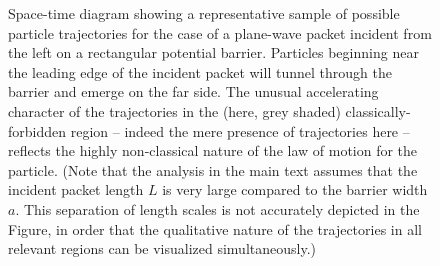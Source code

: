 \documentclass[aps,prc,twocolumn,letterpaper,floatfix]{revtex4}
\begin{document}
\begin{figure}[t]
\begin{center}
\caption{
Space-time diagram showing a 
representative sample of possible particle trajectories for the case
of a plane-wave packet incident from the left on a rectangular
potential barrier.  Particles beginning near the leading edge of the
incident packet will tunnel through the barrier and emerge on the far
side.  The unusual accelerating character of the trajectories in the
(here, grey shaded) classically-forbidden region -- indeed the mere
presence of trajectories here -- reflects the highly non-classical
nature of the law of motion for the particle.  (Note that the analysis
in the main text assumes that the incident packet length $L$ is very
large compared to the barrier width $a$.  This separation of length
scales is not accurately depicted in the Figure, in order that the
qualitative nature of the trajectories in all relevant regions can be
visualized simultaneously.)
\label{fig4}
}
\end{center}
\end{figure}
\end{document}
